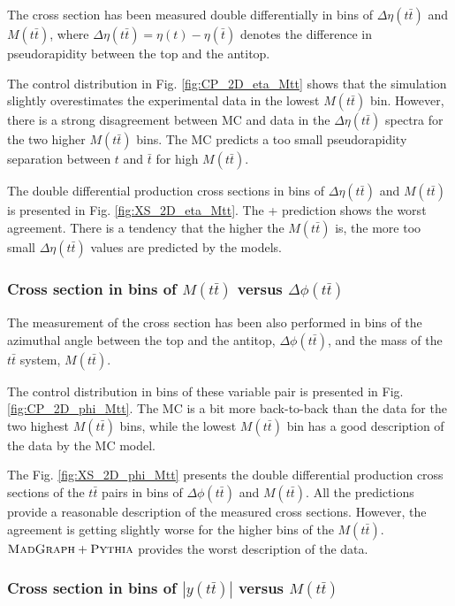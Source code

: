 The cross section has been measured double differentially in bins of $\Delta\eta(t\bar{t})$ and $M(t\bar{t})$, where $\Delta\eta(t\bar{t}) = \eta(t) - \eta(\bar{t})$
denotes the difference in pseudorapidity between the top and the antitop.

The control distribution in Fig. \ref{fig:CP_2D_eta_Mtt} shows that the simulation slightly overestimates the experimental data in the lowest $M(t\bar{t})$
bin. However, there is a strong disagreement between MC and data in the $\Delta\eta(t\bar{t})$ spectra for the two higher $M(t\bar{t})$ bins. The MC predicts 
a too small pseudorapidity separation between $t$ and $\bar{t}$ for high $M(t\bar{t})$.

The double differential production cross sections in bins of $\Delta\eta(t\bar{t})$ and $M(t\bar{t})$ is presented in Fig. \ref{fig:XS_2D_eta_Mtt}. The \MG + \PYTHIA
prediction shows the worst agreement. There is a tendency that the higher the $M(t\bar{t})$ is, the more too small $\Delta\eta(t\bar{t})$ values are predicted by
the models.

\subsubsection{Cross section in bins of $M(t\bar{t})$ versus $\Delta\phi(t\bar{t})$}

The measurement of the cross section has been also performed in bins of the azimuthal angle between the top and the antitop, $\Delta\phi(t\bar{t})$, and the mass
of the $t\bar{t}$ system, $M(t\bar{t})$.

The control distribution in bins of these variable pair is presented in Fig. \ref{fig:CP_2D_phi_Mtt}. The MC is a bit more back-to-back than the data for the
two highest $M(t\bar{t})$ bins, while the lowest $M(t\bar{t})$ bin has a good description of the data by the MC model.

The Fig. \ref{fig:XS_2D_phi_Mtt} presents the double differential production cross sections of the $t\bar{t}$ pairs in bins of $\Delta\phi(t\bar{t})$ and $M(t\bar{t})$.
All the predictions provide a reasonable description of the measured cross sections. However, the agreement is getting slightly worse for the higher bins of the $M(t\bar{t})$.
$\textsc{MadGraph}+\textsc{Pythia}$ provides the worst description of the data.

\subsubsection{Cross section in bins of $|y(t\bar{t})|$ versus $M(t\bar{t})$}

